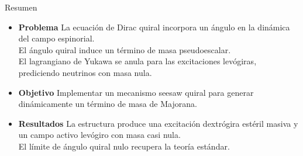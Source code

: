 \begin{block}{Resumen}
  \begin{itemize}
    \item \textbf{Problema} La ecuación de Dirac quiral incorpora un ángulo
      en la dinámica del campo espinorial. \\
      El ángulo quiral induce un término de masa pseudoescalar. \\
      El lagrangiano de Yukawa se anula para las excitaciones levógiras,
      prediciendo neutrinos con masa nula.

    \item \textbf{Objetivo} Implementar un mecanismo seesaw quiral para generar
      dinámicamente un término de masa de Majorana.

    \item \textbf{Resultados} La estructura produce una excitación dextrógira
      estéril masiva y un campo activo levógiro con masa casi nula. \\
      El límite de ángulo quiral nulo recupera la teoría estándar.
  \end{itemize}
\end{block}
